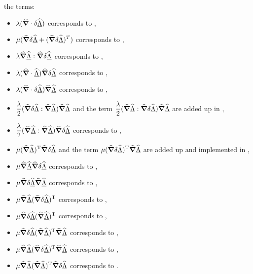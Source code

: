 the terms:
\begin{itemize}
\item $\displaystyle \lambda(\delOp\cdot\delta\Spost)$ corresponds
  to ,
\item $\displaystyle \mu(\delOp\delta\Spost +
  (\delOp\delta\Spost)^T)$ corresponds to ,
\item $\displaystyle \lambda\delOp\Spost:\delOp\delta\Spost$
  corresponds to ,
\item $\displaystyle \lambda(\delOp\cdot\Spost)\delOp\delta\Spost$
  corresponds to ,
\item $\displaystyle \lambda(\delOp\cdot\delta\Spost)\delOp\Spost$
  corresponds to ,
\item $\displaystyle
  \frac{\lambda}{2}(\delOp\delta\Spost:\delOp\Spost)\delOp\Spost$ and
  the term $\displaystyle
  \frac{\lambda}{2}(\delOp\Spost:\delOp\delta\Spost)\delOp\Spost$ are
  added up in ,
\item $\displaystyle
  \frac{\lambda}{2}(\delOp\Spost:\delOp\Spost)\delOp\delta\Spost$
  corresponds to ,
\item $\displaystyle \mu(\delOp\Spost)^{\text{T}}\delOp\delta\Spost$
  and the term $\displaystyle
  \mu(\delOp\delta\Spost)^{\text{T}}\delOp\Spost$ are added up and
  implemented in ,
\item $\displaystyle \mu\delOp\Spost\delOp\delta\Spost$ corresponds
  to ,
\item $\displaystyle \mu\delOp\delta\Spost\delOp\Spost$ corresponds
  to ,
\item $\displaystyle \mu\delOp\Spost(\delOp\delta\Spost)^{\text{T}}$
  corresponds to ,
\item $\displaystyle \mu\delOp\delta\Spost(\delOp\Spost)^{\text{T}}$
  corresponds to ,
\item $\displaystyle
  \mu\delOp\delta\Spost(\delOp\Spost)^{\text{T}}\delOp\Spost$
  corresponds to ,
\item $\displaystyle
  \mu\delOp\Spost(\delOp\delta\Spost)^{\text{T}}\delOp\Spost$
  corresponds to ,
\item $\displaystyle
  \mu\delOp\Spost(\delOp\Spost)^{\text{T}}\delOp\delta\Spost$
  corresponds to .
\end{itemize}


